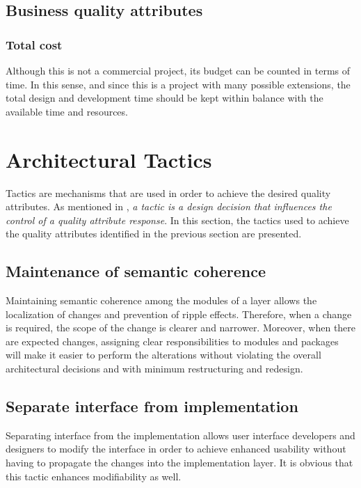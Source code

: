 \subsection{Business quality attributes}

\subsubsection{Total cost}
Although this is not a commercial project, its budget can be counted in terms of time. In this sense, and since this is a project with many possible extensions, the total design and development time should be kept within balance with the available time and resources.

\section{Architectural Tactics}
\label{sec:Architecture.ArchitecturalTactics}

Tactics are mechanisms that are used in order to achieve the desired quality attributes. As mentioned in \cite{SEI}, \textit{a tactic is a design decision that influences the control of a quality attribute response}. In this section, the tactics used to achieve the quality attributes identified in the previous section are presented.

\subsection{Maintenance of semantic coherence}
Maintaining semantic coherence among the modules of a layer allows the localization of changes and prevention of ripple effects. Therefore, when a change is required, the scope of the change is clearer and narrower. Moreover, when there are expected changes, assigning clear responsibilities to modules and packages will make it easier to perform the alterations without violating the overall architectural decisions and with minimum restructuring and redesign.

\subsection{Separate interface from implementation}
Separating interface from the implementation allows user interface developers and designers to modify the interface in order to achieve enhanced usability without having to propagate the changes into the implementation layer. It is obvious that this tactic enhances modifiability as well.

